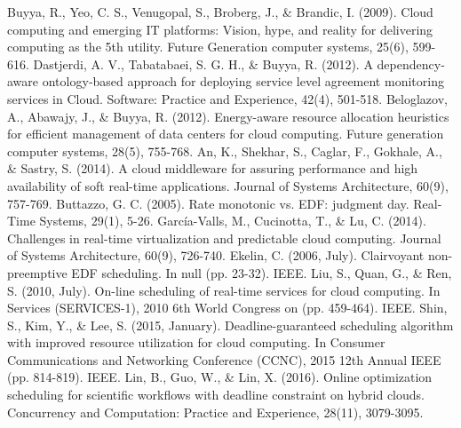 \documentclass[conference]{IEEEtran}
\begin{document}
\begin{thebibliography}{11}
 Buyya, R., Yeo, C. S., Venugopal, S., Broberg, J., \& Brandic, I. (2009). Cloud computing and emerging IT platforms: Vision, hype, and reality for delivering computing as the 5th utility. Future Generation computer systems, 25(6), 599-616.
 Dastjerdi, A. V., Tabatabaei, S. G. H., \& Buyya, R. (2012). A dependency‐aware ontology‐based approach for deploying service level agreement monitoring services in Cloud. Software: Practice and Experience, 42(4), 501-518.
 Beloglazov, A., Abawajy, J., \& Buyya, R. (2012). Energy-aware resource allocation heuristics for efficient management of data centers for cloud computing. Future generation computer systems, 28(5), 755-768.
 An, K., Shekhar, S., Caglar, F., Gokhale, A., \& Sastry, S. (2014). A cloud middleware for assuring performance and high availability of soft real-time applications. Journal of Systems Architecture, 60(9), 757-769.
 Buttazzo, G. C. (2005). Rate monotonic vs. EDF: judgment day. Real-Time Systems, 29(1), 5-26.
 García-Valls, M., Cucinotta, T., \& Lu, C. (2014). Challenges in real-time virtualization and predictable cloud computing. Journal of Systems Architecture, 60(9), 726-740.
 Ekelin, C. (2006, July). Clairvoyant non-preemptive EDF scheduling. In null (pp. 23-32). IEEE.
 Liu, S., Quan, G., \& Ren, S. (2010, July). On-line scheduling of real-time services for cloud computing. In Services (SERVICES-1), 2010 6th World Congress on (pp. 459-464). IEEE.
 Shin, S., Kim, Y., \& Lee, S. (2015, January). Deadline-guaranteed scheduling algorithm with improved resource utilization for cloud computing. In Consumer Communications and Networking Conference (CCNC), 2015 12th Annual IEEE (pp. 814-819). IEEE.
 Lin, B., Guo, W., \& Lin, X. (2016). Online optimization scheduling for scientific workflows with deadline constraint on hybrid clouds. Concurrency and Computation: Practice and Experience, 28(11), 3079-3095.
\end{thebibliography}
\end{document}
